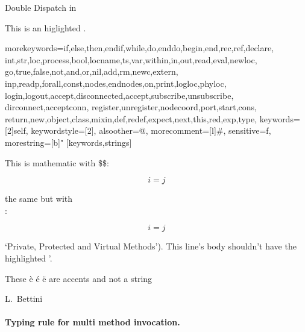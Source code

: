 
{Double Dispatch in \CC}

This is an higlighted \command.

%
  {morekeywords={if,else,then,endif,while,do,enddo,begin,end,rec,ref,declare,%
      int,str,loc,process,bool,locname,ts,var,within,in,out,read,eval,newloc,%
      go,true,false,not,and,or,nil,add,rm,newc,extern,%
      inp,readp,forall,const,nodes,endnodes,on,print,logloc,phyloc,%
      login,logout,accept,disconnected,accept,subscribe,unsubscribe,%
      dirconnect,acceptconn,%
      register,unregister,nodecoord,port,start,cons,%
      return,new,object,class,mixin,def,redef,expect,next,this,red,exp,type},%
    keywords=[2]{self},%
    keywordstyle=[2]\ttfamily,%
    alsoother=@,%
    morecomment=[l]\#,%
    sensitive=f,%
    morestring=[b]"%
   }[keywords,strings]


This is mathematic with \$\$:

$$
i = j
$$

the same but with \[ \]:

\[
i = j
\]

`Private, Protected and Virtual Methods').
This line's body shouldn't have the highlighted '.

These \`e \'e \"e are accents and not a string

L.~Bettini

\paragraph*{Typing rule for multi method invocation.}
